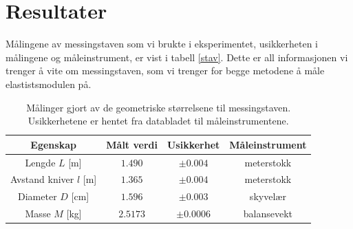 \documentclass[%
 reprint,
 amsmath,amssymb,
 aps,
 norsk,
 booktabs
]{revtex4-1}
\begin{document}
\section{Resultater}
Målingene av messingstaven som vi brukte i eksperimentet, usikkerheten i målingene og måleinstrument, er vist i tabell \vref{stav}. Dette er all informasjonen vi trenger å vite om messingstaven, som vi trenger for begge metodene å måle elastistsmodulen på.
\begin{table}[h!]
\centering
\caption{Målinger gjort av de geometriske størrelsene til messingstaven. Usikkerhetene er hentet fra databladet til måleinstrumentene.}
\label{stav}
\begin{tabular}{cccc}
    Egenskap & Målt verdi      &    Usikkerhet & Måleinstrument \\
    \hline
    Lengde $L$ [m] & $1.490$    & $\pm 0.004$  & meterstokk  \\
    Avstand kniver $l$ [m] & $1.365$ & $\pm0.004$ & meterstokk \\
    Diameter $D$ [cm] & $1.596$    & $\pm0.003$ & skyvelær    \\
    Masse $M$    [kg]  & $2.5173$   & $\pm0.0006$   & balansevekt \\  \hline
\end{tabular}
\end{table}
\end{document}
